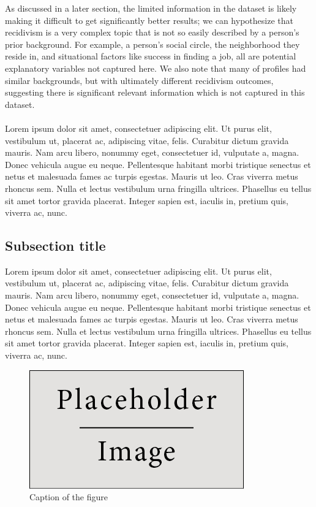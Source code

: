 \documentclass[a4paper]{article}
\theoremstyle{plain}
\begin{document}
As discussed in a later section, the limited information in the dataset is likely making it difficult to get significantly better results; we can hypothesize that recidivism is a very complex topic that is not so easily described by a person's prior background. For example, a person's social circle, the neighborhood they reside in, and situational factors like success in finding a job, all are potential explanatory variables not captured here.\cite{tillyer2011social} We also note that many of profiles had similar backgrounds, but with ultimately different recidivism outcomes, suggesting there is significant relevant information which is not captured in this dataset.

\paragraph{}
Lorem ipsum dolor sit amet, consectetuer adipiscing elit. Ut purus elit, vestibulum ut, placerat ac, adipiscing vitae, felis. Curabitur dictum gravida mauris. Nam arcu libero, nonummy eget, consectetuer id, vulputate a, magna. Donec vehicula augue eu neque. Pellentesque habitant morbi tristique senectus et netus et malesuada fames ac turpis egestas. Mauris ut leo. Cras viverra metus rhoncus sem. Nulla et lectus vestibulum urna fringilla ultrices. Phasellus eu tellus sit amet tortor gravida placerat. Integer sapien est, iaculis in, pretium quis, viverra ac, nunc.

\subsection{Subsection title}

Lorem ipsum dolor sit amet, consectetuer adipiscing elit. Ut purus elit, vestibulum ut, placerat ac, adipiscing vitae, felis. Curabitur dictum gravida mauris. Nam arcu libero, nonummy eget, consectetuer id, vulputate a, magna. Donec vehicula augue eu neque. Pellentesque habitant morbi tristique senectus et netus et malesuada fames ac turpis egestas. Mauris ut leo. Cras viverra metus rhoncus sem. Nulla et lectus vestibulum urna fringilla ultrices. Phasellus eu tellus sit amet tortor gravida placerat. Integer sapien est, iaculis in, pretium quis, viverra ac, nunc.

\begin{figure}[H]
\centering
\includegraphics[scale=0.6]{test_image.jpg}
\caption{Caption of the figure}
\end{figure}
\end{document}
